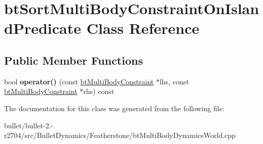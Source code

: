\hypertarget{classbt_sort_multi_body_constraint_on_island_predicate}{\section{bt\+Sort\+Multi\+Body\+Constraint\+On\+Island\+Predicate Class Reference}
\label{classbt_sort_multi_body_constraint_on_island_predicate}
}
\subsection*{Public Member Functions}
\begin{DoxyCompactItemize}
\item 
\hypertarget{classbt_sort_multi_body_constraint_on_island_predicate_a3ddc76b9e0070e0c0950320077299b89}{bool {\bfseries operator()} (const \hyperlink{classbt_multi_body_constraint}{bt\+Multi\+Body\+Constraint} $\ast$lhs, const \hyperlink{classbt_multi_body_constraint}{bt\+Multi\+Body\+Constraint} $\ast$rhs) const }\label{classbt_sort_multi_body_constraint_on_island_predicate_a3ddc76b9e0070e0c0950320077299b89}

\end{DoxyCompactItemize}


The documentation for this class was generated from the following file\+:\begin{DoxyCompactItemize}
\item 
bullet/bullet-\/2.-\/r2704/src/\+Bullet\+Dynamics/\+Featherstone/bt\+Multi\+Body\+Dynamics\+World.\+cpp\end{DoxyCompactItemize}
